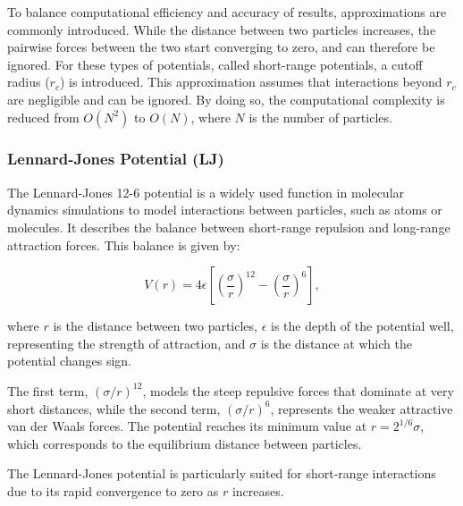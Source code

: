 To balance computational efficiency and accuracy of results, approximations are commonly introduced. While the distance between two particles increases, the pairwise forces between the two start converging to zero, and can therefore be ignored. For these types of potentials, called short-range potentials, a cutoff radius (\(r_c\)) is introduced. This approximation assumes that interactions beyond \(r_c\) are negligible and can be ignored. By doing so, the computational complexity is reduced from \(O(N^2)\) to \(O(N)\), where \(N\) is the number of particles. \parencite{gratl2022n}


\subsubsection{Lennard-Jones Potential (LJ)}

The Lennard-Jones 12-6 potential is a widely used function in molecular dynamics simulations to model interactions between particles, such as atoms or molecules. It describes the balance between short-range repulsion and long-range attraction forces. This balance is given by:

\[
V(r) = 4\epsilon \left[ \left(\frac{\sigma}{r}\right)^{12} - \left(\frac{\sigma}{r}\right)^{6} \right],
\]

where \(r\) is the distance between two particles, \(\epsilon\) is the depth of the potential well, representing the strength of attraction, and \(\sigma\) is the distance at which the potential changes sign. \parencite{wang2020lennard}

The first term, \((\sigma/r)^{12}\), models the steep repulsive forces that dominate at very short distances, while the second term, \((\sigma/r)^{6}\), represents the weaker attractive van der Waals forces. The potential reaches its minimum value at \(r = 2^{1/6} \sigma\), which corresponds to the equilibrium distance between particles.

The Lennard-Jones potential is particularly suited for short-range interactions due to its rapid convergence to zero as \(r\) increases. \parencite{jones1924determination}


